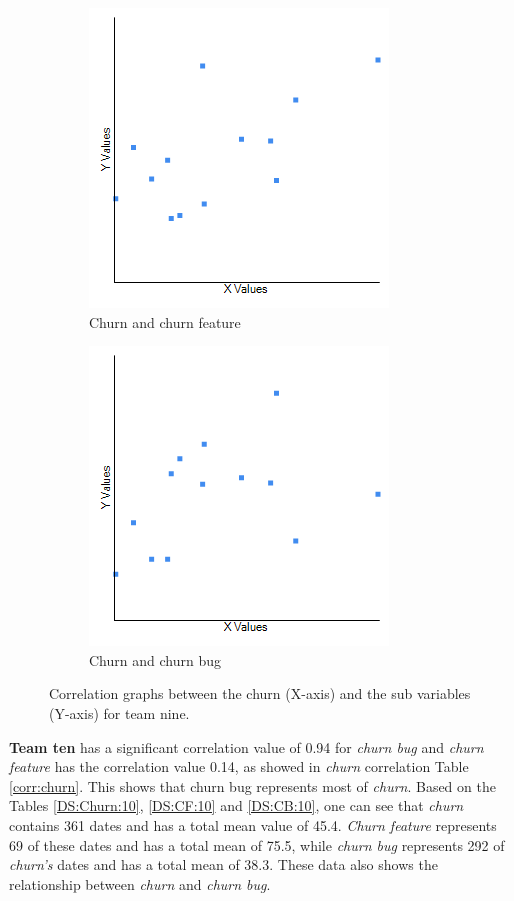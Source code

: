 \documentclass[UKenglish]{ifimaster}  %
\begin{document}
\begin{minipage}[t]{\linewidth}
\begin{figure}[H] 
  \begin{subfigure}[b]{0.5\textwidth}
    \center
\includegraphics[scale=0.6]{Picture/Nine/ChurnVsChurnFT.png}
 \caption{Churn and churn feature} 
 \label{fig:a:9}
  \end{subfigure}
  \begin{subfigure}[b]{0.5\textwidth}
  \center
\includegraphics[scale=0.6]{Picture/Nine/ChurnVsChurnB.png}
 \caption{Churn and churn bug} 
\label{fig:b:9}
  \end{subfigure}
\caption{Correlation graphs between the churn (X-axis)  and the sub variables (Y-axis) for team nine.}
\label{corr:Difference:9}
\end{figure}
\end{minipage}

\textbf{Team ten} has a significant correlation value of 0.94 for \textit{churn bug} and \textit{churn feature} has the correlation value 0.14, as showed in \textit{churn} correlation Table \ref{corr:churn}. This shows that churn bug represents most of \textit{churn}.  Based on the Tables \ref{DS:Churn:10}, \ref{DS:CF:10} and \ref{DS:CB:10}, one can see that \textit{churn} contains 361 dates and has a total mean value of 45.4. \textit{Churn feature} represents 69 of these dates and has a total mean of 75.5, while \textit{churn bug} represents 292 of \textit{churn's} dates and has a total mean of 38.3. These data also shows the relationship between \textit{churn} and \textit{churn bug}.  
\end{document}
